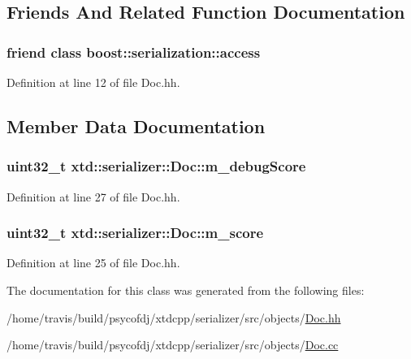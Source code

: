 \subsection{Friends And Related Function Documentation}
\hypertarget{classxtd_1_1serializer_1_1Doc_ac98d07dd8f7b70e16ccb9a01abf56b9c}{
\subsubsection[{boost\-::serialization\-::access}]{\setlength{\rightskip}{0pt plus 5cm}friend class boost\-::serialization\-::access\hspace{0.3cm}{\ttfamily [friend]}}}\label{classxtd_1_1serializer_1_1Doc_ac98d07dd8f7b70e16ccb9a01abf56b9c}


Definition at line 12 of file Doc.\-hh.



\subsection{Member Data Documentation}
\hypertarget{classxtd_1_1serializer_1_1Doc_ae35b707444a257c668b6cc8dfb2d63e4}{
\subsubsection[{m\-\_\-debug\-Score}]{\setlength{\rightskip}{0pt plus 5cm}uint32\-\_\-t xtd\-::serializer\-::\-Doc\-::m\-\_\-debug\-Score}}\label{classxtd_1_1serializer_1_1Doc_ae35b707444a257c668b6cc8dfb2d63e4}


Definition at line 27 of file Doc.\-hh.

\hypertarget{classxtd_1_1serializer_1_1Doc_ac6e0a47819dac6373483fb0dd5ad91d0}{
\subsubsection[{m\-\_\-score}]{\setlength{\rightskip}{0pt plus 5cm}uint32\-\_\-t xtd\-::serializer\-::\-Doc\-::m\-\_\-score}}\label{classxtd_1_1serializer_1_1Doc_ac6e0a47819dac6373483fb0dd5ad91d0}


Definition at line 25 of file Doc.\-hh.



The documentation for this class was generated from the following files\-:\begin{DoxyCompactItemize}
\item 
/home/travis/build/psycofdj/xtdcpp/serializer/src/objects/\hyperlink{Doc_8hh}{Doc.\-hh}\item 
/home/travis/build/psycofdj/xtdcpp/serializer/src/objects/\hyperlink{Doc_8cc}{Doc.\-cc}\end{DoxyCompactItemize}
